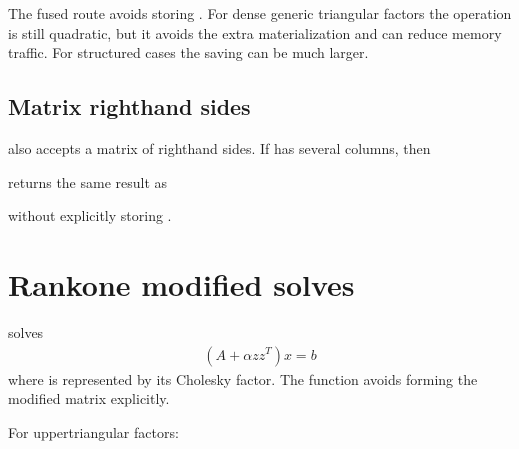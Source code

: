 \documentclass[a4paper,11pt,english]{sphinxmanual}
\begin{document}
\sphinxAtStartPar
The fused route avoids storing .  For dense generic triangular factors the
operation is still quadratic, but it avoids the extra materialization and can
reduce memory traffic.  For structured cases the saving can be much larger.


\subsection{Matrix right\sphinxhyphen{}hand sides}
\label{\detokenize{manual:matrix-right-hand-sides}}
\sphinxAtStartPar
{} also accepts a matrix of right\sphinxhyphen{}hand sides.  If  has several
columns, then

\begin{sphinxVerbatim}[commandchars=\\\{\}]
     
\end{sphinxVerbatim}

\sphinxAtStartPar
returns the same result as

\begin{sphinxVerbatim}[commandchars=\\\{\}]
    
\end{sphinxVerbatim}

\sphinxAtStartPar
without explicitly storing .


\section{Rank\sphinxhyphen{}one modified solves}
\label{\detokenize{manual:rank-one-modified-solves}}
\sphinxAtStartPar
{} solves
\begin{equation*}
\begin{split}(A + \alpha z z^T)x = b\end{split}
\end{equation*}
\sphinxAtStartPar
where  is represented by its Cholesky factor.  The function avoids
forming the modified matrix explicitly.

\sphinxAtStartPar
For upper\sphinxhyphen{}triangular factors:

\begin{sphinxVerbatim}[commandchars=\\\{\}]
     
\end{sphinxVerbatim}
\end{document}
